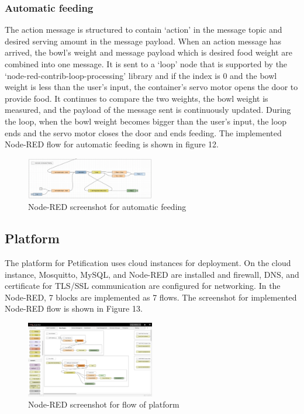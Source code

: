\documentclass[conference]{IEEEtran}
\begin{document}
\subsubsection{Automatic feeding}
The action message is structured to contain ‘action’ in the message topic and desired serving amount in the message payload. When an action message has arrived, the bowl’s weight and message payload which is desired food weight are combined into one message. It is sent to a ‘loop’ node that is supported by the ‘node-red-contrib-loop-processing’ library and if the index is 0 and the bowl weight is less than the user’s input, the container’s servo motor opens the door to provide food. It continues to compare the two weights, the bowl weight is measured, and the payload of the message sent is continuously updated. During the loop, when the bowl weight becomes bigger than the user’s input, the loop ends and the servo motor closes the door and ends feeding. The implemented Node-RED flow for automatic feeding is shown in figure 12.

\begin{figure}[htbp]
\centerline{\includegraphics[width=0.5\textwidth]{./images/automaticFeeding.png}}
\caption{Node-RED screenshot for automatic feeding}
\label{fig}
\end{figure}

\subsection{Platform}
The platform for Petification uses cloud instances for deployment. On the cloud instance, Mosquitto, MySQL, and Node-RED are installed and firewall, DNS, and certificate for TLS/SSL communication are configured for networking. In the Node-RED, 7 blocks are implemented as 7 flows. The screenshot for implemented Node-RED flow is shown in Figure 13.

\begin{figure}[htbp]
\centerline{\includegraphics[width=0.5\textwidth]{./images/platformImpl.png}}
\caption{Node-RED screenshot for flow of platform}
\label{fig}
\end{figure}
\end{document}
